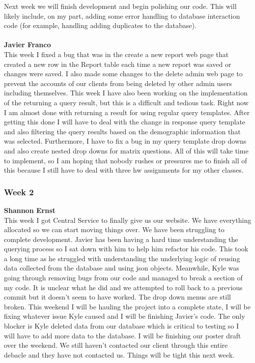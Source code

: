 \documentclass[../final.tex]{subfiles}
\begin{document}
Next week we will finish development and begin polishing our code. This will likely include, on my part, adding some error handling to database interaction code (for example, handling adding duplicates to the database). \\ \\ 
\textbf{Javier Franco}\\
This week I fixed a bug that was in the create a new report web page that created a new row in the Report table each time a new report was saved or changes were saved. I also made some changes to the delete admin web page to prevent the accounts of our clients from being deleted by other admin users including themselves. This week I have also been working on the implementation of the returning a query result, but this is a difficult and tedious task. Right now I am almost done with returning a result for using regular query templates. After getting this done I will have to deal with the change in response query template and also filtering the query results based on the demographic information that was selected. Furthermore, I have to fix a bug in my query template drop downs and also create nested drop downs for matrix questions. All of this will take time to implement, so I am hoping that nobody rushes or pressures me to finish all of this because I still have to deal with three hw assignments for my other classes. \\
\subsubsection{Week 2}
\textbf{Shannon Ernst}\\ 
This week I got Central Service to finally give us our website. We have everything allocated so we can start moving things over. We have been struggling to complete development. Javier has been having a hard time understanding the querying process so I sat down with him to help him refactor his code. This took a long time as he struggled with understanding the underlying logic of reusing data collected from the database and using json objects. Meanwhile, Kyle was going through removing bugs from our code and managed to break a section of my code. It is unclear what he did and we attempted to roll back to a previous commit but it doesn't seem to have worked. The drop down menus are still broken. This weekend I will be hauling the project into a complete state, I will be fixing whatever issue Kyle caused and I will be finishing Javier's code. The only blocker is Kyle deleted data from our database which is critical to testing so I will have to add more data to the database. I will be finishing our poster draft over the weekend. We still haven't contacted our client through this entire debacle and they have not contacted us. Things will be tight this next week.
\end{document}
